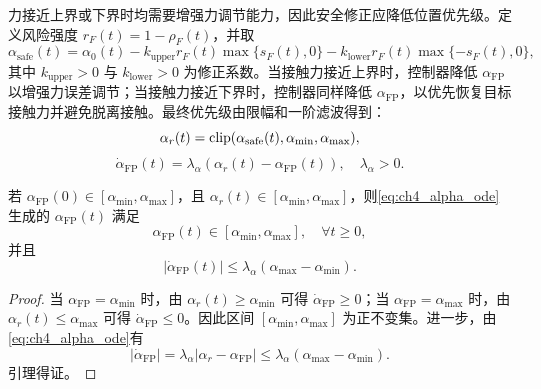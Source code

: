 力接近上界或下界时均需要增强力调节能力，因此安全修正应降低位置优先级。定义风险强度 $r_F(t)=1-\rho_F(t)$，并取
\begin{equation}
  \alpha_{\mathrm{safe}}(t)=\alpha_0(t)-k_{\mathrm{upper}}r_F(t)\max\{s_F(t),0\}-k_{\mathrm{lower}}r_F(t)\max\{-s_F(t),0\},
  \label{eq:ch4_alpha_safe}
\end{equation}
其中 $k_{\mathrm{upper}}>0$ 与 $k_{\mathrm{lower}}>0$ 为修正系数。当接触力接近上界时，控制器降低 $\alpha_{\mathrm{FP}}$ 以增强力误差调节；当接触力接近下界时，控制器同样降低 $\alpha_{\mathrm{FP}}$，以优先恢复目标接触力并避免脱离接触。最终优先级由限幅和一阶滤波得到：
\begin{equation}
  \alpha_r(t)=\operatorname{clip}(\alpha_{\mathrm{safe}}(t),\alpha_{\min},\alpha_{\max}),
  \label{eq:ch4_alpha_r}
\end{equation}
\begin{equation}
  \dot\alpha_{\mathrm{FP}}(t)=\lambda_{\alpha}(\alpha_r(t)-\alpha_{\mathrm{FP}}(t)),\quad \lambda_\alpha>0 .
  \label{eq:ch4_alpha_ode}
\end{equation}

\begin{lemma}[力--位优先级的区间不变性与变化率上界]
\label{lem:ch4_alpha_bound}
若 $\alpha_{\mathrm{FP}}(0)\in[\alpha_{\min},\alpha_{\max}]$，且 $\alpha_r(t)\in[\alpha_{\min},\alpha_{\max}]$，则\eqref{eq:ch4_alpha_ode}生成的 $\alpha_{\mathrm{FP}}(t)$ 满足
\begin{equation}
  \alpha_{\mathrm{FP}}(t)\in[\alpha_{\min},\alpha_{\max}],\quad \forall t\ge0,
  \label{eq:ch4_alpha_interval}
\end{equation}
并且
\begin{equation}
  |\dot\alpha_{\mathrm{FP}}(t)|\le \lambda_\alpha(\alpha_{\max}-\alpha_{\min}).
  \label{eq:ch4_alpha_rate}
\end{equation}
\end{lemma}

\begin{proof}
当 $\alpha_{\mathrm{FP}}=\alpha_{\min}$ 时，由 $\alpha_r(t)\ge\alpha_{\min}$ 可得 $\dot\alpha_{\mathrm{FP}}\ge0$；当 $\alpha_{\mathrm{FP}}=\alpha_{\max}$ 时，由 $\alpha_r(t)\le\alpha_{\max}$ 可得 $\dot\alpha_{\mathrm{FP}}\le0$。因此区间 $[\alpha_{\min},\alpha_{\max}]$ 为正不变集。进一步，由\eqref{eq:ch4_alpha_ode}有
\begin{equation}
  |\dot\alpha_{\mathrm{FP}}|=\lambda_\alpha|\alpha_r-\alpha_{\mathrm{FP}}|\le\lambda_\alpha(\alpha_{\max}-\alpha_{\min}).
\end{equation}
引理得证。
\end{proof}

